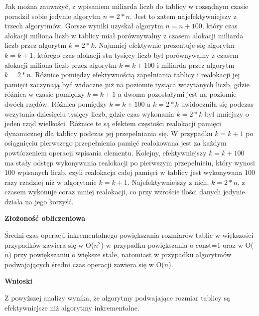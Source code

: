 \documentclass[10pt, a4paper]{article}
\begin{document}
\begin{flushleft}
Jak można zauważyć, z wpisaniem miliarda liczb do tablicy w rozsądnym czasie poradził sobie jedynie algorytm $n=2*n$. Jest to zatem najefektywniejszy z trzech algorytmów. Gorsze wyniki uzyskał algorytm $n=n+100$, który czas alokacji miliona liczb w tablicy miał porównywalny z czasem alokacji miliarda liczb przez algorytm $k=2*k$. Najmniej efektywnie prezentuje się algorytm $k=k+1$, którego czas alokacji stu tysięcy liczb był porównywalny z czasem alokacji miliona liczb przez algorytm $k=k+100$ i miliarda przez algorytm $k=2*n$. Różnice pomiędzy efektywnością zapełniania tablicy i realokacji jej pamięci zaczynają być widoczne już na poziomie tysiąca wczytanych liczb, gdzie różnica w czasie pomiędzy $k=k+1$ a dwoma pozostałymi jest na poziomie dwóch rzędów. Różnica pomiędzy $k=k+100$ a $k=2*k$ uwidoczniła się podczas wczytania dziesięciu tysięcy liczb, gdzie czas wykonania $k=2*k$ był mniejszy o jeden rząd wielkości. Różnice te są efektem częstości realokacji pamięci dynamicznej dla tablicy podczas jej przepełniania się. W przypadku $k=k+1$ po osiągnięciu pierwszego przepełnienia pamięć realokowana jest za każdym powtórzeniem operacji wpisania elementu. Kolejny, efektywniejszy $k=k+100$ ma stały odstęp wykonywania realokacji po pierwszym przepełnieiu, który wynosi 100 wpisanych liczb, czyli realokacja całej pamięci w tablicy jest wykonywana 100 razy rzadziej niż w algorytmie $k=k+1$. Najefektywniejszy z nich, $k=2*n$, z czasem wykonuje coraz mniej realokacji, co przy wzroście ilości danych jedynie działa na jego korzyść. \newline

\textbf{Złożoność obliczeniowa} \newline

Średni czas operacji inkrementalnego powiększania rozmiarów tablic w większości przypadków zawiera się w O($n^2$) w przypadku powiększania o const=1 oraz w O($n$) przy powiększaniu o większe stałe, natomiast w przypadku algorytmów podwajających średni czas operacji zawiera się w O($n$). \newline


\textbf{Wnioski} \newline

Z powyższej analizy wynika, że algorytmy podwajające rozmiar tablicy są efektywniejsze niż algorytmy inkrementalne.
\end{flushleft}
\end{document}
